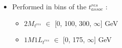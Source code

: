 {{        \small        
        \begin{itemize}
          \footnotesize
        \item Performed in bins of the $t^{res}_{assoc}$ \pT:
          \begin{itemize}
            \footnotesize
          \item $2M_{t^{res}}$ \pT $\in$ [0, 100, 300, $\infty$] GeV
          \item $1M1L_{t^{res}}$ \pT $\in$ [0, 175, $\infty$] GeV 
          \end{itemize}          
        \end{itemize}        
      }
      {

        \vspace{-1.6cm}
        
      }
}

